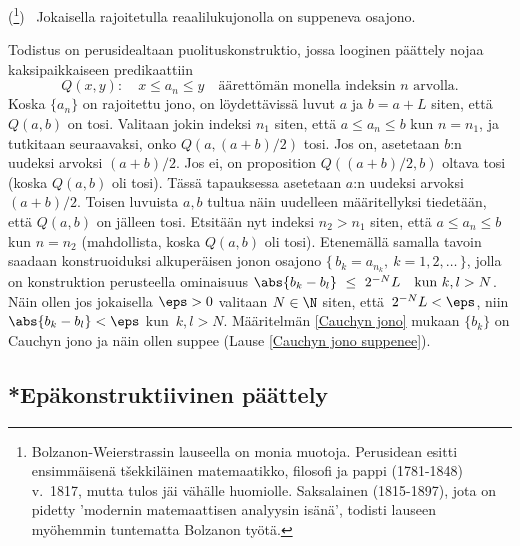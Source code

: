 \begin{*Lause} \label{B-W} 
(\footnote[2]{Bolzanon-Weierstrassin lauseella on monia muotoja.
Perusidean esitti ensimmäisenä t\v{s}ekkiläinen matemaatikko, filosofi ja pappi
 (1781-1848) v.\ 1817, mutta tulos jäi vähälle huomiolle. Saksalainen
 (1815-1897), jota on pidetty 'modernin matemaattisen analyysin isänä',
todisti lauseen myöhemmin tuntematta Bolzanon työtä.  
}) \ Jokaisella rajoitetulla reaalilukujonolla on suppeneva osajono. 
\end{*Lause}
\tod Todistus on perusidealtaan puolituskonstruktio, jossa looginen päättely nojaa
kaksipaikkaiseen predikaattiin
\[
Q(x,y): \quad x \le a_n \le y \quad 
\text{äärettömän monella indeksin $n$ arvolla.}
\]
Koska $\{a_n\}$ on rajoitettu jono, on löydettävissä luvut $a$ ja $b=a+L$ siten, että $Q(a,b)$
on tosi. Valitaan jokin indeksi $n_1$ siten, että $a \le a_n \le b$ kun $n=n_1$, ja tutkitaan
seuraavaksi, onko $Q(a,(a+b)/2)$ tosi. Jos on, asetetaan $b$:n uudeksi arvoksi $(a+b)/2$. Jos
ei, on proposition $Q((a+b)/2,b)$ oltava tosi (koska $Q(a,b)$ oli tosi). Tässä tapauksessa
asetetaan $a$:n uudeksi arvoksi $(a+b)/2$. Toisen luvuista $a,b$ tultua näin uudelleen
määritellyksi tiedetään, että $Q(a,b)$ on jälleen tosi. Etsitään nyt indeksi $n_2 > n_1$ siten,
että $a \le a_n \le b$ kun $n=n_2$ (mahdollista, koska $Q(a,b)$ oli tosi). Etenemällä samalla
tavoin saadaan konstruoiduksi alkuperäisen jonon osajono
$\{\,b_k = a_{n_k},\ k = 1,2,\ldots\,\}$, jolla on konstruktion perusteella ominaisuus
$\abs{b_k - b_l}\ \le\ 2^{-N} L \quad \text{kun}\ k,l > N$. Näin ollen jos jokaisella $\eps>0$
valitaan $N\in\N$ siten, että $\,2^{-N}L<\eps$, niin 
$\abs{b_k-b_l}<\eps$ kun $\,k,l>N$. Määritelmän \ref{Cauchyn jono} mukaan $\{b_k\}$ on Cauchyn
jono ja näin ollen suppee (Lause \ref{Cauchyn jono suppenee}). \loppu

\subsection*{*Epäkonstruktiivinen päättely}

